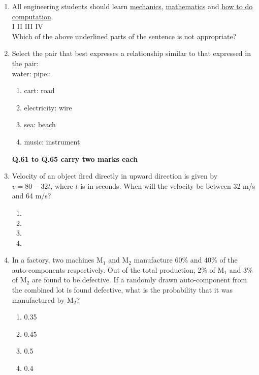 \documentclass[journal,12pt,onecolumn]{IEEEtran}
\theoremstyle{remark}
\begin{document}
\begin{enumerate}[resume]
\item All engineering students should learn \underline{mechanics}, \underline{mathematics} and \underline{how to do computation}. \\
\phantom{xxxxxxxxxxxxxxxxxxxxxxxxxxxxxxxxx}I \phantom{xxxxxxxxxxxx} II \phantom{xxxxxxxxxxxxxxxxxx} III \phantom{xxxxxxxxxx} IV \\
Which of the above underlined parts of the sentence is not appropriate?
    \begin{enumerate}
    \end{enumerate}
    \hfill{}



\item Select the pair that best expresses a relationship similar to that expressed in the pair: \\ water: pipe::
    \begin{enumerate}
        \item cart: road
        \item electricity: wire
        \item sea: beach
        \item music: instrument
    \end{enumerate}
    \hfill{}

\textbf{Q.61 to Q.65 carry two  marks each}


\item Velocity of an object fired directly in upward direction is given by $v = 80 - 32t$, where $t$  is in seconds. When will the velocity be between 32 m/s and 64 m/s?
\begin{enumerate}
    \item {}
    \item {}
    \item {}
    \item {}
\end{enumerate}
\hfill \textbf{}

\item In a factory, two machines M$_1$ and M$_2$ manufacture 60\% and 40\% of the auto-components respectively. Out of the total production, 2\% of M$_1$ and 3\% of M$_2$ are found to be defective. If a randomly drawn auto-component from the combined lot is found defective, what is the probability that it was manufactured by M$_2$?
\begin{enumerate}
    \item 0.35
    \item 0.45
    \item 0.5
    \item 0.4
\end{enumerate}
\hfill \textbf{}


\end{enumerate}
\end{document}
